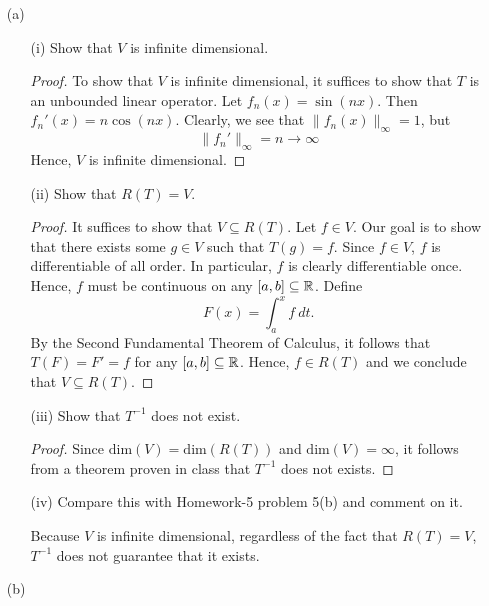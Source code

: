 \documentclass[a4paper]{article}
\begin{document}
\begin{enumerate}
    \item[(a)] 
        \begin{enumerate}
            \item[(i)] Show that \( V  \) is infinite dimensional.
                \begin{proof}
                    To show that \( V  \) is infinite dimensional, it suffices to show that \( T  \) is an unbounded linear operator. Let \( {f}_{n}(x) = \sin(nx) \). Then \( {f}_{n}'(x) = n \cos (nx) \). Clearly, we see that \( \|{f}_{n}(x)\|_{\infty } = 1 \), but
                    \[ \|{f}_{n}'\|_{\infty } = n \to \infty   \]
                  Hence, \( V  \) is infinite dimensional.
                \end{proof}
            \item[(ii)] Show that \( R(T) = V  \).
                \begin{proof}
                    It suffices to show that \( V \subseteq  R(T) \). Let \( f \in V  \). Our goal is to show that there exists some \( g \in V  \) such that  \( T(g) = f \). Since \( f \in V  \), \( f  \) is differentiable of all order. In particular, \( f  \) is clearly differentiable once. Hence, \( f  \) must be continuous on any \( [a,b] \subseteq \mathbb{R} \). Define 
                \[  F(x) = \int_{ a }^{ x } f \ dt. \]
                By the Second Fundamental Theorem of Calculus, it follows that \( T(F) = F' = f  \) for any \( [a,b] \subseteq \mathbb{R}  \). Hence, \( f \in R(T) \) and we conclude that \( V \subseteq R(T) \).
                \end{proof}
            \item[(iii)] Show that \( T^{-1} \) does not exist.
                \begin{proof}
                Since \( \text{dim}(V) = \text{dim}(R(T)) \) and \( \text{dim}(V) = \infty  \), it follows from a theorem proven in class that \( T^{-1} \) does not exists.
                \end{proof}
            \item[(iv)] Compare this with Homework-5 problem 5(b) and comment on it.
                \begin{solution}
                    Because \( V \) is infinite dimensional, regardless of the fact that \( R(T) = V  \), \( T^{-1} \) does not guarantee that it exists.
                \end{solution}
        \end{enumerate}
    \item[(b)] 

\end{enumerate}
\end{document}

